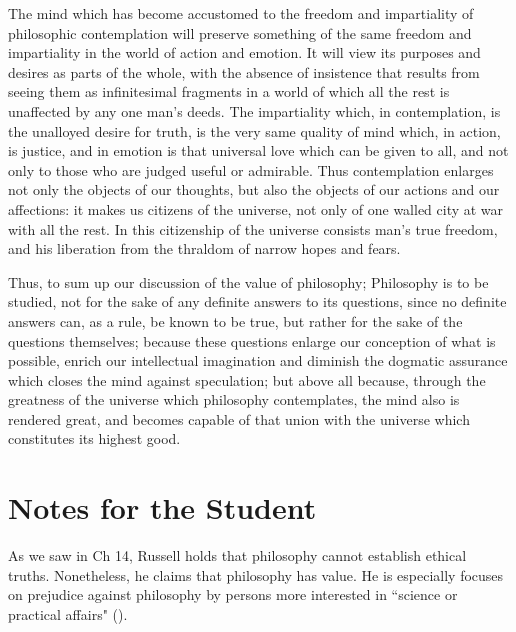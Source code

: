 \documentclass[oneside,letterpaper,12pt]{book}
\begin{document}
The mind which has become accustomed to the freedom and impartiality of
philosophic contemplation will preserve something of the same freedom
and impartiality in the world of action and emotion. \label{serenity} It will view its
purposes and desires as parts of the whole, with the absence of
insistence that results from seeing them as infinitesimal fragments in a
world of which all the rest is unaffected by any one
man's deeds. The impartiality which, in contemplation,
is the unalloyed desire for truth, is the very same quality of mind
which, in action, is justice, and in emotion is that universal love
which can be given to all, and not only to those who are judged useful
or admirable. Thus contemplation enlarges not only the objects of our
thoughts, but also the objects of our actions and our affections: it
makes us citizens of the universe, not only of one walled city at war
with all the rest. In this citizenship of the universe consists
man's true freedom, and his liberation from the thraldom
of narrow hopes and fears.

Thus, to sum up our discussion of the value of philosophy; \label{philosophy} Philosophy is
to be studied, not for the sake of any definite answers to its
questions, since no definite answers can, as a rule, be known to be
true, but rather for the sake of the questions themselves; because these
questions enlarge our conception of what is possible, enrich our
intellectual imagination and diminish the dogmatic assurance which
closes the mind against speculation; but above all because, through the
greatness of the universe which philosophy contemplates, the mind also
is rendered great, and becomes capable of that union with the universe
which constitutes its highest good.

\protect\hypertarget{link2H_4_0017}{}{}

\pagebreak
\section{Notes for the Student}
As we saw in Ch 14, Russell holds that philosophy cannot establish ethical truths. Nonetheless, he claims that philosophy has value. He is especially focuses on prejudice against philosophy by persons more interested in ``science or practical affairs" (\pageref{practical}).
\end{document}
